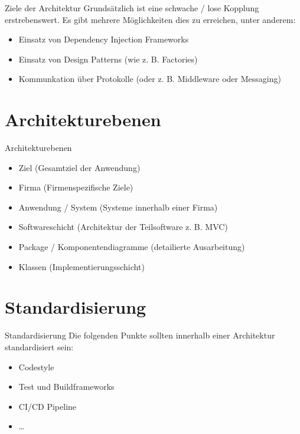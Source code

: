 \documentclass{beamer}
\begin{document}
\begin{frame}{Ziele der Architektur}
	Grundsätzlich ist eine schwache / lose Kopplung erstrebenswert.
	Es gibt mehrere Möglichkeiten dies zu erreichen, unter anderem:

	\begin{itemize}
		\item{Einsatz von Dependency Injection Frameworks}
		\item{Einsatz von Design Patterns (wie z. B. Factories)}
		\item{Kommunkation über Protokolle (oder z. B. Middleware oder
			Messaging)}
	\end{itemize}
\end{frame}

\section{Architekturebenen}

\begin{frame}{Architekturebenen}
	\begin{itemize}
		\item{Ziel (Gesamtziel der Anwendung)}
		\item{Firma (Firmenspezifische Ziele)}
		\item{Anwendung / System (Systeme innerhalb einer Firma)}
		\item{Softwareschicht (Architektur der Teilsoftware z. B. MVC)}
		\item{Package / Komponentendiagramme (detailierte Ausarbeitung)}
		\item{Klassen (Implementierungsschicht)}
	\end{itemize}
\end{frame}

\section{Standardisierung}

\begin{frame}{Standardisierung}
	Die folgenden Punkte sollten innerhalb einer Architektur standardisiert sein:

	\begin{itemize}
		\item Codestyle
		\item Test und Buildframeworks
		\item CI/CD Pipeline
		\item \dots
	\end{itemize}
\end{frame}
\end{document}

